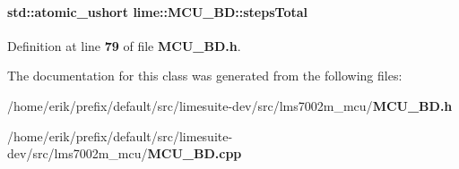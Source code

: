 \paragraph[{steps\+Total}]{\setlength{\rightskip}{0pt plus 5cm}std\+::atomic\+\_\+ushort lime\+::\+M\+C\+U\+\_\+\+B\+D\+::steps\+Total\hspace{0.3cm}{\ttfamily [protected]}}\label{classlime_1_1MCU__BD_ada221030377566e687217f7c3c0b78a9}


Definition at line {\bf 79} of file {\bf M\+C\+U\+\_\+\+B\+D.\+h}.



The documentation for this class was generated from the following files\+:\begin{DoxyCompactItemize}
\item 
/home/erik/prefix/default/src/limesuite-\/dev/src/lms7002m\+\_\+mcu/{\bf M\+C\+U\+\_\+\+B\+D.\+h}\item 
/home/erik/prefix/default/src/limesuite-\/dev/src/lms7002m\+\_\+mcu/{\bf M\+C\+U\+\_\+\+B\+D.\+cpp}\end{DoxyCompactItemize}
